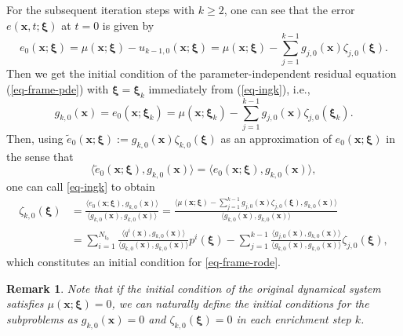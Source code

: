 \documentclass[10pt,a4paper]{article}
\newtheorem{remark}{Remark}
\numberwithin{equation}{section}
\numberwithin{lemma}{section}
\numberwithin{example}{section}
\numberwithin{definition}{section}
\numberwithin{assumption}{section}
\numberwithin{theorem}{section}
\numberwithin{proposition}{section}
\numberwithin{corollary}{section}
\numberwithin{remark}{section}
\def\[{\begin{equation}}
\begin{document}
For the subsequent iteration steps with $k\ge2$, one can see that 
the error $e(\bm{x},t;\bm{\xi})$ at $t=0$ is given by
\begin{equation}
\label{eq-ingk}
e_0(\bm{x};\bm{\xi}) =\mu(\bm{x};\bm{\xi})-u_{k-1,0}(\bm{x};\bm{\xi})
=\mu(\bm{x};\bm{\xi})-\sum_{j=1}^{k-1}g_{j,0}(\bm{x})\zeta_{j,0}(\bm{\xi}).
\end{equation}
Then we get the initial condition of the parameter-independent residual equation (\ref{eq-frame-pde}) with $\bm{\xi}=\bm{\xi}_k$ immediately from (\ref{eq-ingk}), i.e.,
\begin{equation}
\label{eq-initial-deter-residual}
g_{k,0}(\bm{x})=e_{0}(\bm{x};\bm{\xi}_k)=\mu(\bm{x};\bm{\xi}_k)-\sum_{j=1}^{k-1}g_{j,0}(\bm{x})\zeta_{j,0}(\bm{\xi}_k).
\end{equation}
Then, using $\tilde e_{0}(\bm{x};\bm{\xi}):=g_{k,0}(\bm{x})\zeta_{k,0}(\bm{\xi})$ as an approximation of $e_0(\bm{x};\bm{\xi})$ in the sense that
$$\langle \tilde e_0(\bm{x};\bm{\xi}), g_{k,0}(\bm{x})\rangle=\langle e_0(\bm{x};\bm{\xi}), g_{k,0}(\bm{x})\rangle, $$ 
one can call \eqref{eq-ingk} to obtain
\begin{equation}
\label{eq-intial-rode}
\begin{aligned}
\zeta_{k,0}(\bm{\xi})
&
=\frac{\langle e_{0}(\bm{x};\bm{\xi}), g_{k,0}(\bm{x}) \rangle}{\langle g_{k,0}(\bm{x}), g_{k,0}(\bm{x}) \rangle}
=\frac{\langle \mu(\bm{x};\bm{\xi})-\sum\limits_{j=1}^{k-1}g_{j,0}(\bm{x})\zeta_{j,0}(\bm{\xi}),g_{k,0}(\bm{x})\rangle}{\langle g_{k,0}(\bm{x}), g_{k,0}(\bm{x}) \rangle}
\\[2mm]
& 
=\sum\limits_{i=1}^{N_{t_0}}\frac{\langle q^i(\bm{x}),g_{k,0}(\bm{x})\rangle}{\langle g_{k,0}(\bm{x}), g_{k,0}(\bm{x}) \rangle}p^i(\bm{\xi})
-\sum\limits_{j=1}^{k-1}\frac{\langle g_{j,0}(\bm{x}),g_{k,0}(\bm{x})\rangle}{\langle g_{k,0}(\bm{x}), g_{k,0}(\bm{x}) \rangle}\zeta_{j,0}(\bm{\xi}),
\end{aligned}
\end{equation}
which constitutes an initial condition for \eqref{eq-frame-rode}. 

 


\begin{remark}
Note that if the initial condition of the original dynamical system satisfies $\mu(\bm{x};\bm{\xi})=0$, we can naturally define the initial conditions for the subproblems as $g_{k,0}(\bm{x})=0$ and $\zeta_{k,0}(\bm{\xi})=0$ in each enrichment step $k$.
\end{remark}
\end{document}
